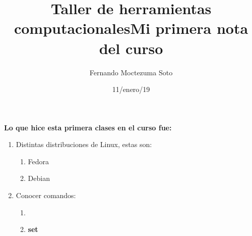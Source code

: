 \documentclass[etterpaper, 12pt, oneside]{article}%
\title{\Huge Taller de herramientas computacionales}
\author{Fernando Moctezuma Soto}
\date{11/enero/19}
\begin{document}
	\maketitle
	
	\newpage
	
	\title{\Huge Mi primera nota del curso\\}
	
	\textbf{Lo que hice esta primera clases en el curso fue:}
	
	\begin{enumerate}
		\item Distintas distribuciones de Linux, estas son:
		\begin{enumerate}
			\item Fedora
			\item Debian
		\end{enumerate}
		\item Conocer comandos:
		\begin{enumerate}
			\item\color{red}{set}
			\item\color{magenta}\textbf{set}
		\end{enumerate}
	\end{enumerate}
	
\end{document}
